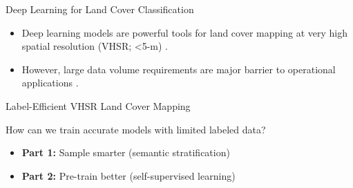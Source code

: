 \documentclass[aspectratio=169]{beamer}
\begin{document}
\begin{frame}{Deep Learning for Land Cover Classification}
    \begin{itemize}
        \item<1-> Deep learning models are powerful tools for land cover mapping at \alert{very high spatial resolution (VHSR; <5-m)} \citep{zhuDeepLearningRemote2017a,liDeepLearningUrban2024,zhaoLandUseLand2023}.
        \item<2-> However, large data volume requirements are major barrier to \alert{operational applications} \citep{huTransferringDeepConvolutional2015}.
    \end{itemize}
\end{frame}



\begin{frame}{Label-Efficient VHSR Land Cover Mapping}
    \begin{center}
        \huge
        \alert{How can we train accurate models with limited labeled data?}
    \end{center}
    \vspace{0.5cm}
    \begin{itemize}
        \item<2-> \textbf{Part 1:} \alert{Sample smarter} (semantic stratification)
        \item<3-> \textbf{Part 2:} \alert{Pre-train better} (self-supervised learning)
    \end{itemize}
\end{frame}
\end{document}
